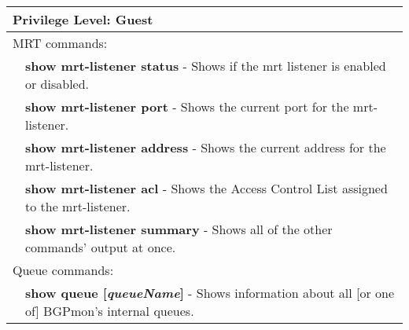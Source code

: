 \begin{tabular}{|p{10pt}p{400pt}|}

\hline

\multicolumn{2}{|l|}{{\bf Privilege Level:} Guest }\\ 

\hline

\hline

\multicolumn{2}{|l|}{MRT commands:}\\ 

\hline

& {\bf \small show mrt-listener status} - Shows if the mrt listener is enabled or disabled.\\[4pt]

& {\bf \small show mrt-listener port} - Shows the current port for the mrt-listener.\\[4pt]

& {\bf \small show mrt-listener address} - Shows the current address for the mrt-listener.\\[4pt]

& {\bf \small show mrt-listener acl} - Shows the Access Control List assigned to the mrt-listener.\\[4pt]

& {\bf \small show mrt-listener summary} - Shows all of the other commands' output at once.\\[4 pt]

\hline

\multicolumn{2}{|l|}{Queue commands:}\\ 

\hline

& {\bf \small show queue [\emph{queueName}]} - Shows information about all [or one of] BGPmon's internal queues.\\[4pt]

\hline

\end{tabular}

\newpage
